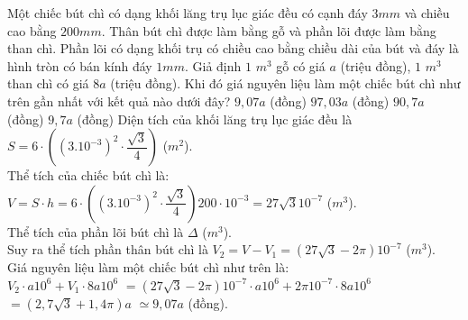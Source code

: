 \begin{ex}%
	Một chiếc bút chì có dạng khối lăng trụ lục giác đều có cạnh đáy $3mm$ và chiều cao bằng $200mm$. Thân bút chì được làm bằng gỗ và phần lõi được làm bằng than chì. Phần lõi có dạng khối trụ có chiều cao bằng chiều dài của bút và đáy là hình tròn có bán kính đáy $1mm$. Giả định $1$ ${m}^3$ gỗ có giá $a$ (triệu đồng), $1$ ${m}^3$ than chì có giá $8a$ (triệu đồng). Khi đó giá nguyên liệu làm một chiếc bút chì như trên gần nhất với kết quả nào dưới đây?
	\choice
	{$9,07a$ (đồng)}
	{$97,03a$ (đồng)}
	{$90,7a$ (đồng)}
	{\True$9,7a$ (đồng)}
	\loigiai
	{
		Diện tích của khối lăng trụ lục giác đều là $S=6\cdot\left(\left(3.10^{-3}\right)^2\cdot\dfrac{\sqrt{3}}{4}\right)$ (${m}^2$).\\
		Thể tích của chiếc bút chì là: $V=S\cdot h=6\cdot\left(\left(3.10^{-3}\right)^2\cdot\dfrac{\sqrt{3}}{4}\right){200\cdot10^{-3}}=27\sqrt{3}{10^{-7}}$ (${m}^3$).\\
		Thể tích của phần lõi bút chì là $\Delta $ (${m}^3$).\\
		Suy ra thể tích phần thân bút chì là $V_2=V-V_1=\left(27\sqrt{3}-2\pi\right){10^{-7}}$ (${m}^3$).\\
		Giá nguyên liệu làm một chiếc bút chì như trên là:\\
		$V_2\cdot a{10^6}+V_1 \cdot 8a{10^6}$ $=\left(27\sqrt{3}-2\pi\right){10^{-7}}\cdot a{10^6}+2\pi{10^{-7}}\cdot 8a{10^6}$ $=\left(2,7\sqrt{3}+1,4\pi\right)a$ $\simeq 9,07a$ (đồng).}
\end{ex}

